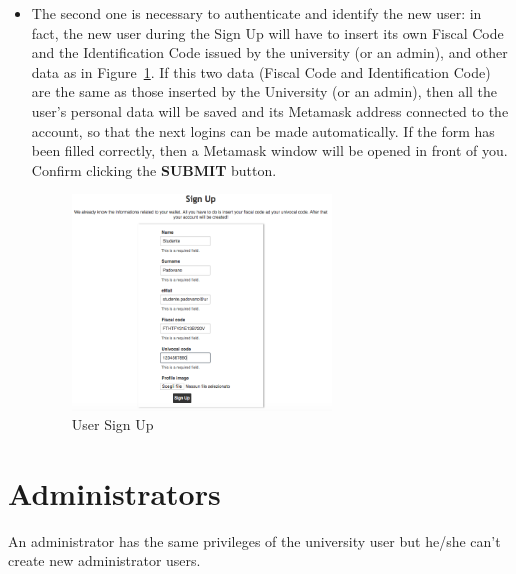 \begin{itemize}
	\item The second one is necessary to authenticate and identify the new user: in fact, the  new user during the Sign Up will have to insert its own Fiscal Code and the Identification Code issued by the university (or an admin), and other data as in Figure~\ref{fig:stdSignUp}. If this two data (Fiscal Code and Identification Code) are the same as those inserted by the University (or an admin), then all the user's personal data will be saved and its Metamask address connected to the account, so that the next logins can be made automatically.
	If the form has been filled correctly, then a Metamask window will be opened in front of you. Confirm clicking the \textbf{SUBMIT} button.
	\begin{figure}[H]
		\centering
		\includegraphics[width=0.65\textwidth]{img/stdSignUp.png}
		\caption{User Sign Up}
		\label{fig:stdSignUp}
	\end{figure}
\end{itemize}

\newpage
\section{Administrators}
An administrator has the same privileges of the university user but he/she can't create new administrator users.






